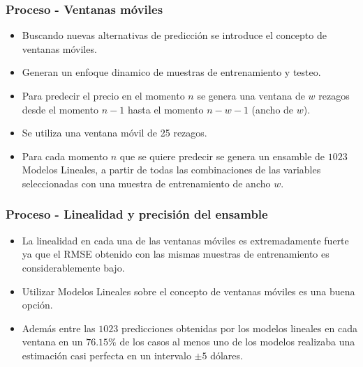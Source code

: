 \documentclass{beamer}
\begin{document}
\begin{frame}[t]
\frametitle{Proceso - Ventanas móviles}

\vfill
\begin{itemize}
\item
Buscando nuevas alternativas de predicción se introduce el concepto de ventanas móviles.
\item 
Generan un enfoque dinamico de muestras de entrenamiento y testeo.
\item 
Para predecir el precio en el momento $n$ se genera una ventana de $w$ rezagos desde el momento $n-1$ hasta el momento $n-w-1$ (ancho de $w$). 
\item
Se utiliza una ventana móvil de 25 rezagos. 
\item
Para cada momento $n$ que se quiere predecir se genera un ensamble de $1023$ Modelos Lineales, a partir de todas las combinaciones de las variables seleccionadas con una muestra de entrenamiento de ancho $w$.

\vfill
\end{itemize}

\end{frame}
\begin{frame}[t]
\frametitle{Proceso - Linealidad y precisión del ensamble}
\vfill
\begin{itemize}
\item 
La linealidad en cada una de las ventanas móviles es extremadamente fuerte ya que el RMSE obtenido con las mismas muestras de entrenamiento es considerablemente bajo.
\item 
Utilizar Modelos Lineales sobre el concepto de ventanas móviles es una buena opción.
\item 
Además entre las $1023$ predicciones obtenidas por los modelos lineales en cada ventana en un  $76.15\%$ de los casos al menos uno de los modelos realizaba una estimación casi perfecta en un intervalo $\pm 5$ dólares. 
\vfill
\end{itemize}
\end{frame}
\end{document}
